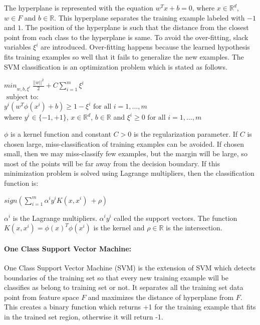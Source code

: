 \documentclass[12pt,oneside,a4paper]{article}
\begin{document}
The hyperplane is represented with the equation $w^{T} x + b = 0$, where $x \in \mathbb{R}^d$, $w \in F$ and $b \in \mathbb{R}$. This hyperplane separates the training example labeled with $-1$ and $1$. The position of the hyperplane is such that the distance from the closest point from each class to the hyperplane is same. To avoid the over-fitting, slack variables $\xi^{i}$ are introduced. Over-fitting happens because the learned hypothesis fits training examples so well that it fails to generalize the new examples. The SVM classification is an optimization problem which is stated as follows.\cite{svm} \cite{svm-ml}

\begin{center}
  ${min}_{w,b,\xi^i} \ \frac{||w||^2}{2} + C \sum_{i=1}^m \xi^i$ \\
  $\mbox{ subject to: }$ \\
  $y^i( w^T \phi(x^i) + b) \geq 1 - \xi^i \mbox{ for all } i = 1, \dots, m$ \\
  where $y^{i} \in \{-1, +1\}$, $x \in \mathbb{R}^d$, $b \in \mathbb{R}$ and $\xi^i \geq 0 \mbox{ for all } i = 1, \dots, m$ \\
\end{center}

 $\phi$ is a kernel function and constant $C > 0$ is the regularization parameter. If $C$ is chosen large, miss-classification of training examples can be avoided. If chosen small, then we may miss-classify few examples, but the margin will be large, so most of the points will be far away from the decision boundary. If this minimization problem is solved using Lagrange multipliers, then the classification function is:

\begin{center}
$sign(\sum_{i=1}^m \alpha^i y^i K(x,x^i) \ + \rho)$
\end{center}

$\alpha^i$ is the Lagrange multipliers. $\alpha^i y^i$ called the support vectors. The function $K(x,x^i)=\phi(x)^T \phi(x^i)$ is the kernel and $\rho \in \mathbb{R}$ is the intersection.

\paragraph{One Class Support Vector Machine:}

One Class Support Vector Machine (SVM) is the extension of SVM which detects boundaries of the training set so that every new training example will be classifies as belong to training set or not. It separates all the training set data point from feature space $F$ and maximizes the distance of hyperplane from $F$. This creates a binary function which returns +1 for the training example that fits in the trained set region, otherwise it will return -1.
\end{document}
